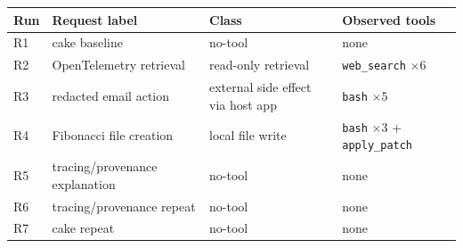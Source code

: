 \begin{tabularx}{\linewidth}{@{}l X l X@{}}
\toprule
Run & Request label & Class & Observed tools \\
\midrule
R1 & cake baseline & no-tool & none \\
R2 & OpenTelemetry retrieval & read-only retrieval & \texttt{web\_search} \( \times 6 \) \\
R3 & redacted email action & external side effect via host app & \texttt{bash} \( \times 5 \) \\
R4 & Fibonacci file creation & local file write & \texttt{bash} \( \times 3 \) + \texttt{apply\_patch} \\
R5 & tracing/provenance explanation & no-tool & none \\
R6 & tracing/provenance repeat & no-tool & none \\
R7 & cake repeat & no-tool & none \\
\bottomrule
\end{tabularx}

